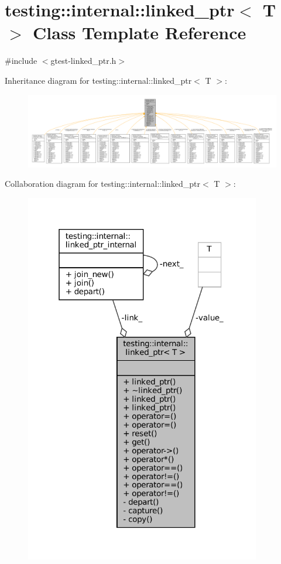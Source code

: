 \hypertarget{classtesting_1_1internal_1_1linked__ptr}{}\section{testing\+:\+:internal\+:\+:linked\+\_\+ptr$<$ T $>$ Class Template Reference}
\label{classtesting_1_1internal_1_1linked__ptr}


{\ttfamily \#include $<$gtest-\/linked\+\_\+ptr.\+h$>$}



Inheritance diagram for testing\+:\+:internal\+:\+:linked\+\_\+ptr$<$ T $>$\+:
\nopagebreak
\begin{figure}[H]
\begin{center}
\leavevmode
\includegraphics[width=350pt]{classtesting_1_1internal_1_1linked__ptr__inherit__graph}
\end{center}
\end{figure}


Collaboration diagram for testing\+:\+:internal\+:\+:linked\+\_\+ptr$<$ T $>$\+:
\nopagebreak
\begin{figure}[H]
\begin{center}
\leavevmode
\includegraphics[width=292pt]{classtesting_1_1internal_1_1linked__ptr__coll__graph}
\end{center}
\end{figure}
